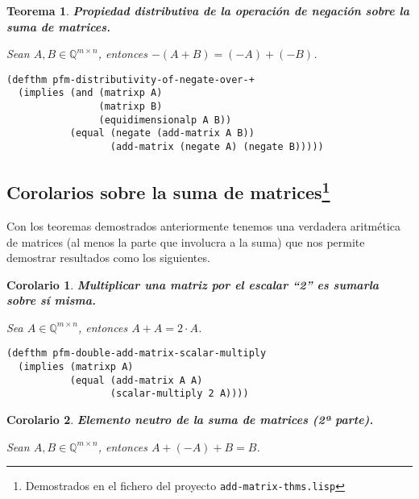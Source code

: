 \documentclass[a4paper,10pt]{article}
\newcommand{\M}[3]{#1 \in \mathbb{Q}^{#2 \times #3}}
\newtheorem{teor}{{Teorema}}
\newtheorem{coro}{{Corolario}}
\begin{document}
\begin{teor} \textbf{Propiedad distributiva de la operación de negación sobre la suma de matrices.}\vspace{8pt}\par
Sean $\M{A,B}{m}{n}$, entonces $-(A + B) = (-A) + (-B)$.
\end{teor}

\begin{lstlisting}[language=clips]
(defthm pfm-distributivity-of-negate-over-+
  (implies (and (matrixp A)
                (matrixp B)
                (equidimensionalp A B))
           (equal (negate (add-matrix A B))
                  (add-matrix (negate A) (negate B)))))
\end{lstlisting}	

\vspace{12pt}
\subsection[Corolarios sobre la suma de matrices]{Corolarios sobre la suma de matrices\footnote{Demostrados en el fichero del proyecto \texttt{add-matrix-thms.lisp}}}
\vspace{10pt}

Con los teoremas demostrados anteriormente tenemos una verdadera aritmética de matrices (al menos la parte que involucra a la suma) que nos permite demostrar resultados como los siguientes.

\par \vspace{16pt}

\begin{coro} \textbf{Multiplicar una matriz por el escalar ``2'' es sumarla sobre sí misma.}\vspace{8pt}\par
Sea $\M{A}{m}{n}$, entonces $A + A = 2 \cdot A$.
\end{coro}

\begin{lstlisting}[language=clips]
(defthm pfm-double-add-matrix-scalar-multiply
  (implies (matrixp A)
           (equal (add-matrix A A)
                  (scalar-multiply 2 A))))
\end{lstlisting}	

\par \vspace{16pt}

\begin{coro} \textbf{Elemento neutro de la suma de matrices (2ª parte).}\vspace{8pt}\par
Sean $\M{A,B}{m}{n}$, entonces $A + (-A) + B = B$.
\end{coro}
\end{document}
